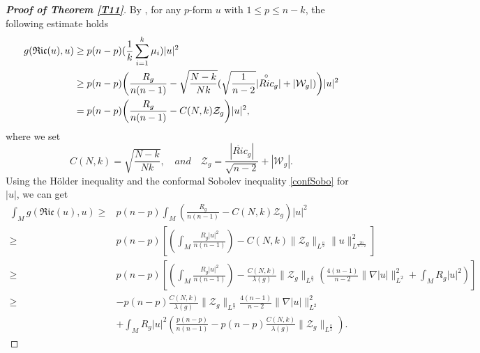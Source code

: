 \documentclass[12pt, twoside]{article}
\theoremstyle{definition}
\numberwithin{equation}{section}
\def \la {\lambda}
\def\na {\nabla}
\begin{document}
\begin{proof}[\textbf{Proof of Theorem \ref{T11}}]
By \cite[Lemma 2.1]{PW21a}, for any $p$-form $u$ with $1\leq p\leq n-k$, the following  estimate holds
	\begin{equation*}
	\begin{split}
	g(\mathfrak{Ric}(u),u)&\geq p(n-p)(\frac{1}{k}\sum_{i=1}^{k}\mu_{i})|u|^{2}\\
	&\geq p(n-p)\bigg{(}\frac{R_{g}}{n(n-1)}-\sqrt{\frac{N-k}{Nk}}(\sqrt{\frac{ 1}{n-2}}|\overset{\circ}{Ric}_{g}|+|\mathcal{W}_{g}|)\bigg{)}|u|^{2}\\
	&= p(n-p)\bigg{(}\frac{R_{g}}{n(n-1)}-C(N,k)\mathcal{Z}_{g}\bigg{)}|u|^{2},\\
	\end{split}
	\end{equation*}
	where we set
	$$C(N,k)= \sqrt{\frac{N-k}{Nk}},\quad and\quad 
	\mathcal{Z}_g= \frac{|\mathring{Ric}_g|}{\sqrt{n-2}} + |\mathcal{W}_g|.$$
Using the H\"older inequality and the conformal  Sobolev inequality \eqref{confSobo} for $|u|$, we can get
	\begin{align*}
\int_{M}g(\mathfrak{Ric}(u),u)
	\geq& p(n-p)\int_{M}\left(\frac{R_{g}}{n(n-1)}-C(N,k)\mathcal{Z}_{g}\right)|u|^{2}\\
	\geq& p(n-p)\left[\left(\int_{M}\frac{R_{g}|u|^{2}}{n(n-1)}\right)-C(N,k)\|\mathcal{Z}_{g}\|_{L^{ \frac{n}{2} }}\|u\|^{2}_{L^{\frac{2n}{n-2} }} \right]\\
	\geq &p(n-p)\left[\left(\int_{M}\frac{R_{g}|u|^{2}}{n(n-1)}\right)-\frac{C(N,k)}{\la(g)}\|\mathcal{Z}_{g}\|_{L^{ \frac{n}{2} }}  \left(\frac{4(n-1)}{n-2}\|\na| u|\|^{2}_{L^{2}}+\int_{M}R_{g}|u|^{2}\right)\right]\\
	\geq&-p(n-p)\frac{C(N,k)}{\la(g)}\|\mathcal{Z}_{g}\|_{L^{ \frac{n}{2} }}\frac{4(n-1)}{n-2} \|\na |u|\|^{2}_{L^{2}}\\
	&+\int_{M}R_{g}|u|^{2}\left(\frac{p(n-p)}{n(n-1)}-p(n-p)\frac{C(N,k)}{\la(g)}\|\mathcal{Z}_{g}\|_{L^{ \frac{n}{2} }}\right).
\end{align*}
	

\end{proof}
\end{document}
